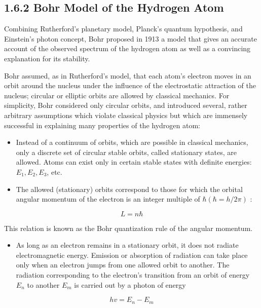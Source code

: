 \documentclass[10pt]{article}
\begin{document}
\subsection*{1.6.2 Bohr Model of the Hydrogen Atom}
Combining Rutherford's planetary model, Planck's quantum hypothesis, and Einstein's photon concept, Bohr proposed in 1913 a model that gives an accurate account of the observed spectrum of the hydrogen atom as well as a convincing explanation for its stability.

Bohr assumed, as in Rutherford's model, that each atom's electron moves in an orbit around the nucleus under the influence of the electrostatic attraction of the nucleus; circular or elliptic orbits are allowed by classical mechanics. For simplicity, Bohr considered only circular orbits, and introduced several, rather arbitrary assumptions which violate classical physics but which are immensely successful in explaining many properties of the hydrogen atom:

\begin{itemize}
  \item Instead of a continuum of orbits, which are possible in classical mechanics, only a discrete set of circular stable orbits, called stationary states, are allowed. Atoms can exist only in certain stable states with definite energies: $E_{1}, E_{2}, E_{3}$, etc.
  \item The allowed (stationary) orbits correspond to those for which the orbital angular momentum of the electron is an integer multiple of $\hbar(\hbar=h / 2 \pi)$ :
\end{itemize}


\begin{equation*}
L=n \hbar \tag{1.63}
\end{equation*}


This relation is known as the Bohr quantization rule of the angular momentum.

\begin{itemize}
  \item As long as an electron remains in a stationary orbit, it does not radiate electromagnetic energy. Emission or absorption of radiation can take place only when an electron jumps from one allowed orbit to another. The radiation corresponding to the electron's transition from an orbit of energy $E_{n}$ to another $E_{m}$ is carried out by a photon of energy
\end{itemize}


\begin{equation*}
h v=E_{n}-E_{m} \tag{1.64}
\end{equation*}
\end{document}

